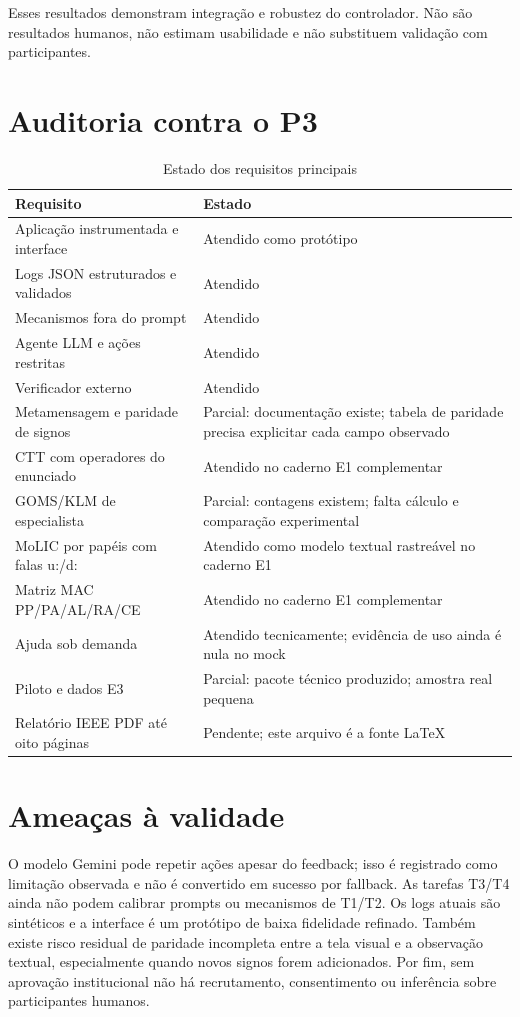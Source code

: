 \documentclass[conference]{IEEEtran}
\begin{document}
Esses resultados demonstram integração e robustez do controlador. Não são
resultados humanos, não estimam usabilidade e não substituem validação com
participantes.

\section{Auditoria contra o P3}
\begin{table}[t]
\caption{Estado dos requisitos principais}
\label{tab:audit}
\centering
\begin{tabularx}{\columnwidth}{p{}X}
\toprule
Requisito & Estado\\
\midrule
Aplicação instrumentada e interface & Atendido como protótipo\\
Logs JSON estruturados e validados & Atendido\\
Mecanismos fora do prompt & Atendido\\
Agente LLM e ações restritas & Atendido\\
Verificador externo & Atendido\\
Metamensagem e paridade de signos & Parcial: documentação existe; tabela de paridade precisa explicitar cada campo observado\\
CTT com operadores do enunciado & Atendido no caderno E1 complementar\\
GOMS/KLM de especialista & Parcial: contagens existem; falta cálculo e comparação experimental\\
MoLIC por papéis com falas u:/d: & Atendido como modelo textual rastreável no caderno E1\\
Matriz MAC PP/PA/AL/RA/CE & Atendido no caderno E1 complementar\\
Ajuda sob demanda & Atendido tecnicamente; evidência de uso ainda é nula no mock\\
Piloto e dados E3 & Parcial: pacote técnico produzido; amostra real pequena\\
Relatório IEEE PDF até oito páginas & Pendente; este arquivo é a fonte \LaTeX{}\\
\bottomrule
\end{tabularx}
\end{table}

\section{Ameaças à validade}
O modelo Gemini pode repetir ações apesar do feedback; isso é registrado como
limitação observada e não é convertido em sucesso por fallback. As tarefas
T3/T4 ainda não podem calibrar prompts ou mecanismos de T1/T2. Os logs atuais
são sintéticos e a interface é um protótipo de baixa fidelidade refinado.
Também existe risco residual de paridade incompleta entre a tela visual e a
observação textual, especialmente quando novos signos forem adicionados.
Por fim, sem aprovação institucional não há recrutamento, consentimento ou
inferência sobre participantes humanos.
\end{document}
